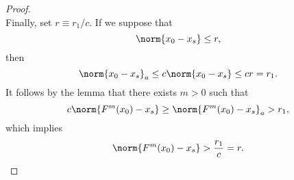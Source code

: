 \documentclass[11pt]{book}
\begin{document}
\begin{proof}
\begin{equation*}
  \end{equation*}
  Finally, set $r \equiv r_1/c$. If we suppose that 
  \begin{equation*}
    \norm{x_0 - x_s} \leq r,
  \end{equation*}
  then
  \begin{equation*}
    \norm{x_0 - x_s}_a \leq c \norm{x_0 - x_s} \leq cr = r_1.
  \end{equation*}
  It follows by the lemma that there exists $m > 0$ such that 
  \begin{equation*}
    c \norm{F^m(x_0) - x_s} \geq \norm{F^m(x_0) - x_s}_a > r_1,
  \end{equation*}
  which implies
  \begin{equation*}
    \norm{F^{m}(x_0) - x_s} > \frac{r_1}{c} = r.
  \end{equation*}
\end{proof}

% 
\end{document}
